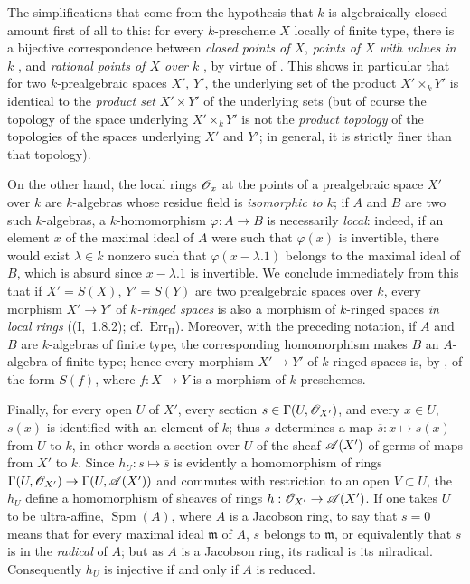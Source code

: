 \begin{env}[10.10.3]
\label{IV.10.10.3}
The simplifications that come from the hypothesis that $k$ is algebraically closed amount first of all to this: for every $k$-prescheme $X$ locally of finite type, there is a bijective correspondence between \emph{closed points of $X$}, \emph{points of $X$ with values in $k$} , and \emph{rational points of $X$ over $k$} , by virtue of .
This shows in particular  that for two $k$-prealgebraic spaces $X'$, $Y'$, the underlying set of the product $X'\times_kY'$ is identical to the \emph{product set} $X'\times Y'$ of the underlying sets (but of course the topology of the space underlying $X'\times_kY'$ is not the \emph{product topology} of the topologies of the spaces underlying $X'$ and $Y'$; in general, it is strictly finer than that topology).

On the other hand, the local rings $\mathscr{O}_x$ at the points of a prealgebraic space $X'$ over $k$ are $k$-algebras whose residue field is \emph{isomorphic to $k$}; if $A$ and $B$ are two such $k$-algebras, a $k$-homomorphism $\varphi:A\to B$ is necessarily \emph{local}: indeed, if an element $x$ of the maximal ideal of $A$ were such that $\varphi(x)$ is invertible, there would exist $\lambda\in k$ nonzero such that $\varphi(x-\lambda.1)$ belongs to the maximal ideal of $B$, which is absurd since $x-\lambda.1$ is invertible.
We conclude immediately from this that if $X'=S(X)$, $Y'=S(Y)$ are two prealgebraic spaces over $k$, every morphism $X'\to Y'$ of \emph{$k$-ringed spaces} is also a morphism of $k$-ringed spaces \emph{in local rings} ((I,~1.8.2); cf.\ $\mathrm{Err}_{\mathrm{II}}$). Moreover, with the preceding notation, if $A$ and $B$ are $k$-algebras of finite type, the corresponding homomorphism makes $B$ an $A$-algebra of finite type; hence every morphism $X'\to Y'$ of $k$-ringed spaces is, by , of the form $S(f)$, where $f:X\to Y$ is a morphism of $k$-preschemes.

Finally, for every open $U$ of $X'$, every section $s\in\Gamma(U,\mathscr{O}_{X'})$, and every $x\in U$, $s(x)$  is identified with an element of $k$; thus $s$ determines a map $\overline{s}:x\mapsto s(x)$ from $U$ to $k$, in other words a section over $U$ of the sheaf $\mathscr{A}(X')$ of germs of maps from $X'$ to $k$. Since $h_U:s\mapsto\overline{s}$ is evidently a homomorphism of rings $\Gamma(U,\mathscr{O}_{X'})\to\Gamma(U,\mathscr{A}(X'))$ and commutes with restriction to an open $V\subset U$, the $h_U$ define a homomorphism of sheaves of rings $h:\mathscr{O}_{X'}\to\mathscr{A}(X')$.
If one takes $U$ to be ultra-affine, $\operatorname{Spm}(A)$, where $A$ is a Jacobson ring, to say that $\overline{s}=0$ means that for every maximal ideal $\mathfrak{m}$ of $A$, $s$ belongs to $\mathfrak{m}$, or equivalently that $s$ is in the \emph{radical} of $A$; but as $A$ is a Jacobson ring, its radical is its nilradical. Consequently $h_U$ is injective if and only if $A$ is reduced.
\end{env}

